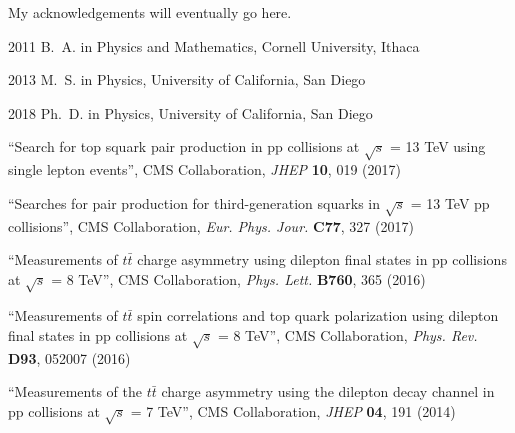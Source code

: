 \begin{frontmatter}
%
\tableofcontents
\listoffigures  %
\listoftables   %



%
%
\begin{acknowledgements}
My acknowledgements will eventually go here. %
\end{acknowledgements}


%
%
\begin{vitapage}
\begin{vita}
  \item[2011] B.~A. in Physics and Mathematics, Cornell University, Ithaca
  \item[2013] M.~S. in Physics, University of California, San Diego
  \item[2018] Ph.~D. in Physics, University of California, San Diego
\end{vita}
\begin{publications}
  \item ``Search for top squark pair production in pp collisions at $\sqrt{s}$ = 13 TeV using single lepton events'', CMS Collaboration, \emph{JHEP} \textbf{10}, 019 (2017) %
  \item ``Searches for pair production for third-generation squarks in $\sqrt{s}$ = 13 TeV pp collisions'', CMS Collaboration, \emph{Eur. Phys. Jour.} \textbf{C77}, 327 (2017) %
  \item ``Measurements of $t\bar{t}$ charge asymmetry using dilepton final states in pp collisions at $\sqrt{s}$ = 8 TeV'', CMS Collaboration, \emph{Phys. Lett.} \textbf{B760}, 365 (2016) %
  \item ``Measurements of $t\bar{t}$ spin correlations and top quark polarization using dilepton final states in pp collisions at $\sqrt{s}$ = 8 TeV'', CMS Collaboration, \emph{Phys. Rev.} \textbf{D93}, 052007 (2016) %
  \item ``Measurements of the $t\bar{t}$ charge asymmetry using the dilepton decay channel in pp collisions at $\sqrt{s}$ = 7 TeV'', CMS Collaboration, \emph{JHEP} \textbf{04}, 191 (2014) %
\end{publications}
\end{vitapage}



\end{frontmatter}
